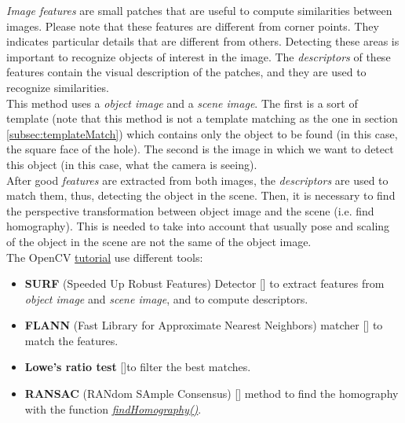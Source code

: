 \textit{Image features} are small patches that are useful to compute similarities between images. Please note that these features are different from corner points.
They indicates particular details that are different from others. Detecting these areas is important to recognize objects of interest in the image. The \textit{descriptors} of these features contain the visual description of the patches, and they are used to recognize similarities.\\
This method uses a \textit{object image} and a \textit{scene image}. The first is a sort of template (note that this method is not a template matching as the one in section \ref{subsec:templateMatch}) which contains only the object to be found (in this case, the square face of the hole). The second is the image in which we want to detect this object (in this case, what the camera is seeing).\\
After good \textit{features} are extracted from both images, the \textit{descriptors} are used to match them, thus, detecting the object in the scene.
Then, it is necessary to find the perspective transformation between object image and the scene (i.e. find homography). This is needed to take into account that usually pose and scaling of the object in the scene are not the same of the object image.\\
The OpenCV \href{https://docs.opencv.org/3.4/d7/dff/tutorial_feature_homography.html}{tutorial} use different tools:
\begin{itemize}
	\item \textbf{SURF} (Speeded Up Robust Features) Detector [\cite{surfDet}] to extract features from \textit{object image} and \textit{scene image}, and to compute descriptors.
	\item \textbf{FLANN} (Fast Library for Approximate Nearest Neighbors) matcher [\cite{flannMatch}] to match the features.
	\item \textbf{Lowe's ratio test} [\cite{loweTest}]to filter the best matches.
	\item \textbf{RANSAC} (RANdom SAmple Consensus) [\cite{ransacHomog}] method to find the homography with the function \href{https://docs.opencv.org/3.4/d9/d0c/group__calib3d.html#ga4abc2ece9fab9398f2e560d53c8c9780}{\textit{findHomography()}}.
\end{itemize}

